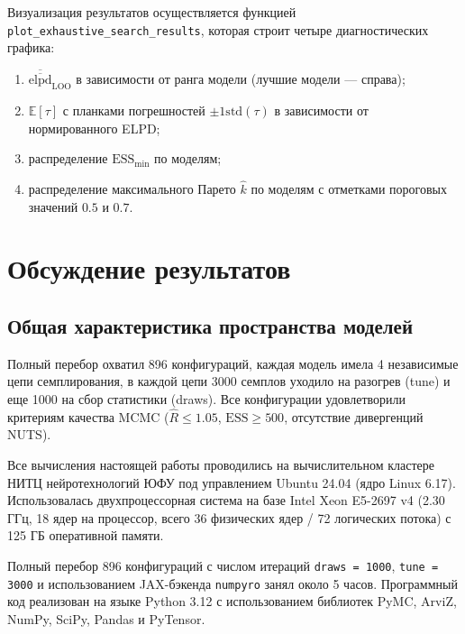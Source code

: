 \documentclass[14pt]{mmcs_article}
\begin{document}
Визуализация результатов осуществляется функцией \linebreak
\texttt{plot\_exhaustive\_search\_results}, которая строит
четыре диагностических графика:
\begin{enumerate}
	\item $\overline{\overline{\mathrm{elpd}}}_{\mathrm{LOO}}$
	в зависимости от ранга модели (лучшие модели —
	справа);
	\item $\mathbb{E}[\tau]$ с планками погрешностей
	$\pm 1 \mathrm{std}(\tau)$ в зависимости от
	нормированного ELPD;
	\item распределение $\mathrm{ESS}_{\min}$ по моделям;
	\item распределение максимального Парето $\hat{k}$ по
	моделям с отметками пороговых значений $0.5$ и $0.7$.
\end{enumerate}

\section{Обсуждение результатов}

\subsection*{Общая характеристика пространства моделей}

Полный перебор охватил 896 конфигураций, каждая модель имела 4 независимые цепи семплирования, в каждой цепи 3000 семплов уходило на разогрев (tune) и еще 1000 на сбор статистики (draws). Все конфигурации
удовлетворили критериям качества MCMC ($\hat{R} \leq 1.05$,
$\mathrm{ESS} \geq 500$, отсутствие дивергенций NUTS). 

Все вычисления настоящей работы проводились на вычислительном
кластере НИТЦ нейротехнологий ЮФУ под
управлением Ubuntu 24.04 (ядро Linux 6.17). Использовалась
двухпроцессорная система на базе Intel Xeon E5-2697 v4
(2.30 ГГц, 18 ядер на процессор, всего 36 физических ядер /
72 логических потока) с 125 ГБ оперативной памяти.

Полный перебор 896 конфигураций с числом итераций
\texttt{draws = 1000}, \texttt{tune = 3000} и использованием
JAX-бэкенда \texttt{numpyro} занял около 5 часов. Программный код реализован на
языке Python 3.12 с использованием библиотек PyMC, ArviZ,
NumPy, SciPy, Pandas и PyTensor.
\end{document}
